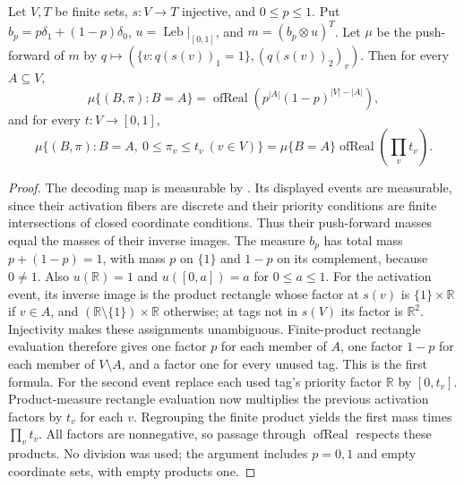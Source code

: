 \begin{lemma}
Let $V,T$ be finite sets, $s:V\to T$ injective, and $0\le p\le1$.
Put $b_p=p\delta_1+(1-p)\delta_0$, $u=\operatorname{Leb}|_{[0,1]}$,
and $m=(b_p\otimes u)^T$. Let $\mu$ be the push-forward of $m$ by
$q\mapsto(\{v:q(s(v))_1=1\},(q(s(v))_2)_v)$.
Then for every $A\subseteq V$,
\[
\mu\{(B,\pi):B=A\}=\operatorname{ofReal}(p^{|A|}(1-p)^{|V|-|A|}),
\]
and for every $t:V\to[0,1]$,
\[
\mu\{(B,\pi):B=A,\ 0\le\pi_v\le t_v\ (v\in V)\}
=\mu\{B=A\}\operatorname{ofReal}(\prod_v t_v).
\]
\end{lemma}
\begin{proof}
The decoding map is measurable by .
Its displayed events are measurable, since their activation fibers are discrete
and their priority conditions are finite intersections of closed coordinate
conditions. Thus their push-forward masses equal the masses of their inverse
images. The measure $b_p$ has total mass $p+(1-p)=1$, with mass $p$ on
$\{1\}$ and $1-p$ on its complement, because $0\ne1$.
Also $u(\mathbb R)=1$ and $u([0,a])=a$ for $0\le a\le1$.
For the activation event, its inverse image is the product rectangle whose
factor at $s(v)$ is $\{1\}\times\mathbb R$ if $v\in A$, and
$(\mathbb R\setminus\{1\})\times\mathbb R$ otherwise; at tags not in
$s(V)$ its factor is $\mathbb R^2$. Injectivity makes these assignments
unambiguous. Finite-product rectangle evaluation therefore gives one factor
$p$ for each member of $A$, one factor $1-p$ for each member of $V\setminus A$,
and a factor one for every unused tag. This is the first formula.
For the second event replace each used tag's priority factor $\mathbb R$
by $[0,t_v]$. Product-measure rectangle evaluation now multiplies the previous
activation factors by $t_v$ for each $v$. Regrouping the finite product yields
the first mass times $\prod_v t_v$. All factors are nonnegative, so passage
through $\operatorname{ofReal}$ respects these products. No division was used;
the argument includes $p=0,1$ and empty coordinate sets, with empty products one.
\end{proof}

